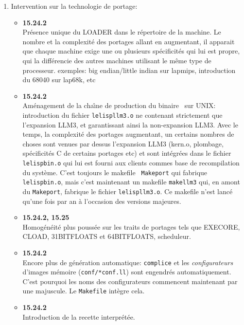 \begin {enumerate}
\item Intervention sur la technologie de portage:

\begin {itemize}

\item {\bf 15.24.2} \\
Pr\'{e}sence unique du LOADER dans le r\'{e}pertoire de la machine.
Le nombre et la complexit\'{e} des portages allant en augmentant, il
apparait que chaque machine exige une ou plusieurs sp\'{e}cificit\'{e}s 
qui lui est
propre, qui la diff\'{e}rencie des autres machines utilisant le m\^{e}me
type de processeur.
exemples: big endian/little indian sur lapmips, introduction du 68040
sur lap68k, etc  

\item {\bf 15.24.2} \\
Am\'{e}nagement de la cha\^{\i}ne de production du binaire \LeLisp\ 
sur UNIX:
introduction du fichier {\tt lelispllm3.o} ne contenant strictement que
l'expansion LLM3, et garantissant ainsi la non-expansion LLM3.
Avec le temps, la complexit\'{e} des portages augmentant, 
un certains nombres de
choses sont venues par dessus l'expansion LLM3 (kern.o, plombage,
sp\'{e}cificit\'{e}s C de certains portages etc) et sont int\'{e}gr\'{e}es dans le
fichier {\tt lelispbin.o} qui lui est fourni aux clients commes base
de recompilation du syst\`{e}me. C'est toujours le makefile {\tt
Makeport} qui fabrique {\tt lelispbin.o}, mais c'est maintenant un
makefile {\tt makellm3} qui, en amont du {\tt Makeport}, 
fabrique le fichier {\tt lelispllm3.o}. Ce
makefile n'est lanc\'{e} qu'une fois par an \`{a} l'occasion des versions
majeures. 

\item {\bf 15.24.2, 15.25} \\
Homog\'{e}n\'{e}it\'{e} plus pouss\'{e}e sur les traits de portages tels que
EXECORE, CLOAD, 31BITFLOATS et 64BITFLOATS, scheduleur.

\item {\bf 15.24.2} \\
Encore plus de g\'{e}n\'{e}ration automatique: {\tt complice} et les
{\it configurateurs} d'images m\'{e}moire ({\tt conf/*conf.ll}) sont
engendr\'{e}s automatiquement. C'est pourquoi les noms des configurateurs
commencent maintenant par une majuscule. Le {\tt Makefile} int\`{e}gre
cela. 

\item {\bf 15.24.2} \\
Introduction de la recette interpr\'{e}t\'{e}e.


\end{itemize}
\end{enumerate}
